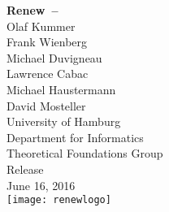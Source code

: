 \begin{titlepage}
\begin{flushright}
  {\bf\Huge
    Renew~--~\parttitle\\[1cm]
  }
  {\Large
    Olaf Kummer\\[4pt]
    Frank Wienberg\\[4pt]
    Michael Duvigneau\\[4pt]
    Lawrence Cabac\\[4pt]
    Michael Haustermann\\[4pt]
    David Mosteller\\[1cm]
  }
  {\large
    University of Hamburg\\[4pt]
    Department for Informatics\\[4pt]
    Theoretical Foundations Group\\[1cm]
    Release \renewversion\\[4pt]
    June 16, 2016\\[4pt]
  }
  \vfill
  \texttt{[image: renewlogo]}
\end{flushright}
\end{titlepage}

\setcounter{page}{2}

